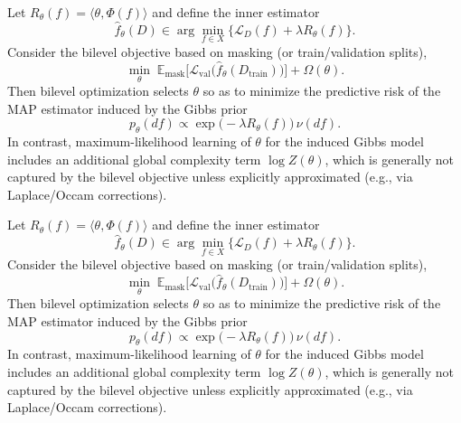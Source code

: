 \begin{proposition}
	Let $R_\theta(f)=\langle \theta,\Phi(f)\rangle$ and define the inner estimator
	\[
		\hat f_\theta(D)\in\arg\min_{f\in X}\Big\{\mathcal L_D(f)+\lambda R_\theta(f)\Big\}.
	\]
	Consider the bilevel objective based on masking (or train/validation splits),
	\[
		\min_\theta \; \mathbb E_{\text{mask}}\Big[\mathcal L_{\mathrm{val}}\big(\hat f_\theta(D_{\mathrm{train}})\big)\Big]+\Omega(\theta).
	\]
	Then bilevel optimization selects $\theta$ so as to minimize the predictive risk of the MAP estimator induced by the Gibbs prior
	\[
		p_\theta(df)\propto \exp\!\big(-\lambda R_\theta(f)\big)\,\nu(df).
	\]
	In contrast, maximum-likelihood learning of $\theta$ for the induced Gibbs model includes an additional global complexity term $\log Z(\theta)$, which is generally not captured by the bilevel objective unless explicitly approximated (e.g., via Laplace/Occam corrections).
\end{proposition}



\begin{proposition}
	Let $R_\theta(f)=\langle \theta,\Phi(f)\rangle$ and define the inner estimator
	\[
		\hat f_\theta(D)\in\arg\min_{f\in X}\Big\{\mathcal L_D(f)+\lambda R_\theta(f)\Big\}.
	\]
	Consider the bilevel objective based on masking (or train/validation splits),
	\[
		\min_\theta \; \mathbb E_{\text{mask}}\Big[\mathcal L_{\mathrm{val}}\big(\hat f_\theta(D_{\mathrm{train}})\big)\Big]+\Omega(\theta).
	\]
	Then bilevel optimization selects $\theta$ so as to minimize the predictive risk of the MAP estimator induced by the Gibbs prior
	\[
		p_\theta(df)\propto \exp\!\big(-\lambda R_\theta(f)\big)\,\nu(df).
	\]
	In contrast, maximum-likelihood learning of $\theta$ for the induced Gibbs model includes an additional global complexity term $\log Z(\theta)$, which is generally not captured by the bilevel objective unless explicitly approximated (e.g., via Laplace/Occam corrections).
\end{proposition}
